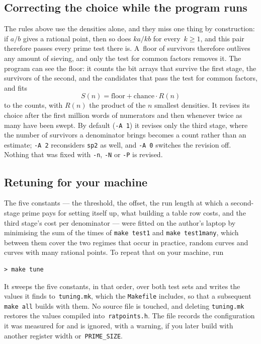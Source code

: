 \documentclass[12pt,a4paper,oneside]{amsart}
\begin{document}
\subsection{Correcting the choice while the program runs}\label{sec:adapt}

The rules above use the densities alone, and they miss one thing by
construction: if $a/b$ gives a rational point, then so does $ka/kb$ for
every~$k \ge 1$, and this pair therefore passes
every prime test there is. A~floor of survivors therefore outlives any amount
of sieving, and only the test for common factors removes it. The program can
see the floor: it counts the bit arrays that survive
the first stage, the survivors of the second, and the candidates that pass
the test for common factors, and fits
\[ S(n) = \text{floor} + \text{chance}\cdot R(n) \]
to the counts, with $R(n)$ the product of the $n$ smallest densities. It
revises its choice after the first million words of numerators and then
whenever twice as many have been swept. By default (\verb+-A 1+) it revises
only the third stage, where the number of survivors a denominator brings
becomes a count rather than an estimate; \verb+-A 2+ reconsiders
\texttt{sp2} as well, and \verb+-A 0+ switches the revision off.
Nothing that was fixed with \verb+-n+, \verb+-N+ or \verb+-P+ is revised.

\subsection{Retuning for your machine}\label{sec:retune}

The five constants --- the threshold, the offset, the run length at which a
second-stage prime pays for setting itself up, what building a table row
costs, and the third stage's cost per denominator --- were fitted on the
author's laptop by minimising the sum of the times of \texttt{make test1}
and \texttt{make test1many}, which between them cover the two regimes that
occur in practice, random curves and curves with many rational points. To
repeat that on your machine, run
\begin{verbatim}
> make tune
\end{verbatim}
It sweeps the five constants, in that order, over both test sets and writes
the values it finds to~\texttt{tuning.mk}, which the \texttt{Makefile}
includes, so that a subsequent \texttt{make all} builds with them. No source
file is touched, and deleting \texttt{tuning.mk} restores the values compiled
into~\texttt{ratpoints.h}. The file records the configuration it was
measured for and is ignored, with a warning, if you later build with another
register width or~\texttt{PRIME\_SIZE}.
\end{document}
